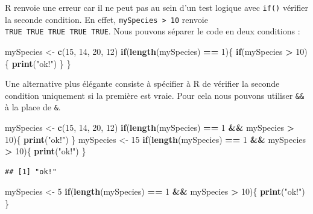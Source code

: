 \documentclass[]{book}
\newenvironment{Shaded}{\begin{snugshade}}{\end{snugshade}}
\newcommand{\ControlFlowTok}[1]{\textcolor[rgb]{0.13,0.29,0.53}{\textbf{#1}}}
\newcommand{\DecValTok}[1]{\textcolor[rgb]{0.00,0.00,0.81}{#1}}
\newcommand{\KeywordTok}[1]{\textcolor[rgb]{0.13,0.29,0.53}{\textbf{#1}}}
\newcommand{\NormalTok}[1]{#1}
\newcommand{\OperatorTok}[1]{\textcolor[rgb]{0.81,0.36,0.00}{\textbf{#1}}}
\newcommand{\StringTok}[1]{\textcolor[rgb]{0.31,0.60,0.02}{#1}}
\begin{document}
R renvoie une erreur car il ne peut pas au sein d'un test logique avec \texttt{if()} vérifier la seconde condition. En effet, \texttt{mySpecies\ \textgreater{}\ 10} renvoie \texttt{TRUE\ TRUE\ TRUE\ TRUE\ TRUE}. Nous pouvons séparer le code en deux conditions :

\begin{Shaded}
\begin{Highlighting}[]
\NormalTok{mySpecies <-}\StringTok{ }\KeywordTok{c}\NormalTok{(}\DecValTok{15}\NormalTok{, }\DecValTok{14}\NormalTok{, }\DecValTok{20}\NormalTok{, }\DecValTok{12}\NormalTok{)}
\ControlFlowTok{if}\NormalTok{(}\KeywordTok{length}\NormalTok{(mySpecies) }\OperatorTok{==}\StringTok{ }\DecValTok{1}\NormalTok{)\{}
  \ControlFlowTok{if}\NormalTok{(mySpecies }\OperatorTok{>}\StringTok{ }\DecValTok{10}\NormalTok{)\{}
    \KeywordTok{print}\NormalTok{(}\StringTok{"ok!"}\NormalTok{)}
\NormalTok{  \}}
\NormalTok{\}}
\end{Highlighting}
\end{Shaded}

Une alternative plus élégante consiste à spécifier à R de vérifier la seconde condition uniquement si la première est vraie. Pour cela nous pouvons utiliser \texttt{\&\&} à la place de \texttt{\&}.

\begin{Shaded}
\begin{Highlighting}[]
\NormalTok{mySpecies <-}\StringTok{ }\KeywordTok{c}\NormalTok{(}\DecValTok{15}\NormalTok{, }\DecValTok{14}\NormalTok{, }\DecValTok{20}\NormalTok{, }\DecValTok{12}\NormalTok{)}
\ControlFlowTok{if}\NormalTok{(}\KeywordTok{length}\NormalTok{(mySpecies) }\OperatorTok{==}\StringTok{ }\DecValTok{1} \OperatorTok{&&}\StringTok{ }\NormalTok{mySpecies }\OperatorTok{>}\StringTok{ }\DecValTok{10}\NormalTok{)\{}
  \KeywordTok{print}\NormalTok{(}\StringTok{"ok!"}\NormalTok{)}
\NormalTok{\}}
\NormalTok{mySpecies <-}\StringTok{ }\DecValTok{15}
\ControlFlowTok{if}\NormalTok{(}\KeywordTok{length}\NormalTok{(mySpecies) }\OperatorTok{==}\StringTok{ }\DecValTok{1} \OperatorTok{&&}\StringTok{ }\NormalTok{mySpecies }\OperatorTok{>}\StringTok{ }\DecValTok{10}\NormalTok{)\{}
  \KeywordTok{print}\NormalTok{(}\StringTok{"ok!"}\NormalTok{)}
\NormalTok{\}}
\end{Highlighting}
\end{Shaded}

\begin{verbatim}
## [1] "ok!"
\end{verbatim}

\begin{Shaded}
\begin{Highlighting}[]
\NormalTok{mySpecies <-}\StringTok{ }\DecValTok{5}
\ControlFlowTok{if}\NormalTok{(}\KeywordTok{length}\NormalTok{(mySpecies) }\OperatorTok{==}\StringTok{ }\DecValTok{1} \OperatorTok{&&}\StringTok{ }\NormalTok{mySpecies }\OperatorTok{>}\StringTok{ }\DecValTok{10}\NormalTok{)\{}
  \KeywordTok{print}\NormalTok{(}\StringTok{"ok!"}\NormalTok{)}
\NormalTok{\}}
\end{Highlighting}
\end{Shaded}
\end{document}
